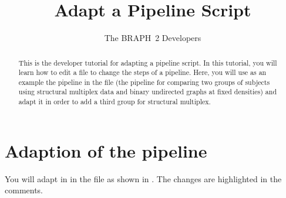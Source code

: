 \documentclass{tufte-handout}
\title{Adapt a Pipeline Script}
\author[The BRAPH~2 Developers]{The BRAPH~2 Developers}
\begin{document}
\maketitle

\begin{abstract}
\noindent
This is the developer tutorial for adapting a pipeline script. 
In this tutorial, you will learn how to edit a  file to change the steps of a pipeline. Here, you will use as an example the pipeline  in the file  (the pipeline for comparing two groups of subjects using structural multiplex data and binary undirected graphs at fixed densities) and adapt it in order to add a third group for structural multiplex.
\end{abstract}

\tableofcontents

\clearpage

\section{Adaption of the pipeline}

You will adapt in  in the file  as shown in . The changes are highlighted in the comments.
\end{document}
